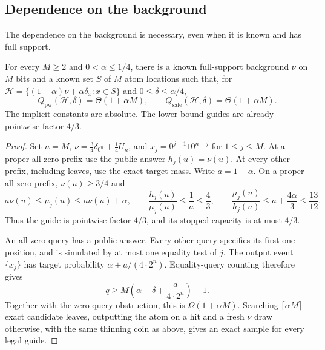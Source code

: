 \subsection{Dependence on the background}
The dependence on the background is necessary, even when it is known and has full support.
\begin{proposition}\label{prop:comb}
For every $M\ge2$ and $0<\alpha\le1/4$, there is a known full-support background $\nu$ on $M$ bits and a known set $S$ of $M$ atom locations such that, for $\mathcal H=\{(1-\alpha)\nu+\alpha\delta_x:x\in S\}$ and $0\le\delta\le\alpha/4$,
\[
 Q_{\mathrm{pw}}(\mathcal H,\delta)
 =\Theta(1+\alpha M),\qquad
 Q_{\mathrm{safe}}(\mathcal H,\delta)
 =\Theta(1+\alpha M).
\]
The implicit constants are absolute. The lower-bound guides are already pointwise factor $4/3$.
\end{proposition}
\begin{proof}
Set $n=M$, $\nu=\tfrac34\delta_{0^n}+\tfrac14U_n$, and
$x_j=0^{j-1}10^{n-j}$ for $1\le j\le M$. At a proper all-zero prefix use the public answer $h_j(u)=\nu(u)$. At every other prefix, including leaves, use the exact target mass. Write $a=1-\alpha$. On a proper all-zero prefix, $\nu(u)\ge3/4$ and
\[
 a\nu(u)\le\mu_j(u)\le a\nu(u)+\alpha,
 \qquad \frac{h_j(u)}{\mu_j(u)}\le\frac1a\le\frac43,
 \qquad \frac{\mu_j(u)}{h_j(u)}\le a+\frac{4\alpha}{3}\le\frac{13}{12}.
\]
Thus the guide is pointwise factor $4/3$, and its stopped capacity is at most $4/3$.

An all-zero query has a public answer. Every other query specifies its first-one position, and is simulated by at most one equality test of $j$. The output event $\{x_j\}$ has target probability $\alpha+a/(4\cdot2^n)$. Equality-query counting therefore gives
\[
 q\ge M\left(\alpha-\delta+\frac{a}{4\cdot2^n}\right)-1.
\]
Together with the zero-query obstruction, this is $\Omega(1+\alpha M)$. Searching $\lceil\alpha M\rceil$ exact candidate leaves, outputting the atom on a hit and a fresh $\nu$ draw otherwise, with the same thinning coin as above, gives an exact sample for every legal guide.
\end{proof}
